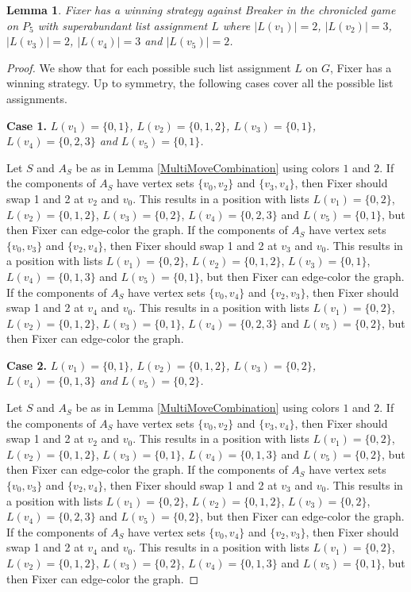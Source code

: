 \documentclass[12pt]{amsart}
\theoremstyle{plain}
\newtheorem{lem}[thm]{Lemma}
\theoremstyle{definition}
\theoremstyle{remark}
\begin{document}

\begin{lem}\label{P5_2}
Fixer has a winning strategy against Breaker in the chronicled game on $P_5$ with superabundant list assignment $L$ where $|L(v_1)| = 2$, $|L(v_2)| = 3$, $|L(v_3)| = 2$, $|L(v_4)| = 3$ and $|L(v_5)| = 2$.
\end{lem}
\begin{proof}
We show that for each possible such list assignment $L$ on $G$, Fixer has a winning strategy.
Up to symmetry, the following cases cover all the possible list assignments.

\noindent\textbf{Case 1.  }\textit{$L(v_1) = \{0, 1\}$, $L(v_2) = \{0, 1, 2\}$, $L(v_3) = \{0, 1\}$, $L(v_4) = \{0, 2, 3\}$ and $L(v_5) = \{0, 1\}$.}

Let $S$ and $A_S$ be as in Lemma \ref{MultiMoveCombination} using colors $1$ and $2$. If the components of $A_S$ have vertex sets $\{v_0, v_2\}$ and $\{v_3, v_4\}$, then Fixer should swap 1 and 2 at $v_2$ and $v_0$. This results in a position with lists $L(v_1) = \{0, 2\}$, $L(v_2) = \{0, 1, 2\}$, $L(v_3) = \{0, 2\}$, $L(v_4) = \{0, 2, 3\}$ and $L(v_5) = \{0, 1\}$, but then Fixer can edge-color the graph.
If the components of $A_S$ have vertex sets $\{v_0, v_3\}$ and $\{v_2, v_4\}$, then Fixer should swap 1 and 2 at $v_3$ and $v_0$. This results in a position with lists $L(v_1) = \{0, 2\}$, $L(v_2) = \{0, 1, 2\}$, $L(v_3) = \{0, 1\}$, $L(v_4) = \{0, 1, 3\}$ and $L(v_5) = \{0, 1\}$, but then Fixer can edge-color the graph.
If the components of $A_S$ have vertex sets $\{v_0, v_4\}$ and $\{v_2, v_3\}$, then Fixer should swap 1 and 2 at $v_4$ and $v_0$. This results in a position with lists $L(v_1) = \{0, 2\}$, $L(v_2) = \{0, 1, 2\}$, $L(v_3) = \{0, 1\}$, $L(v_4) = \{0, 2, 3\}$ and $L(v_5) = \{0, 2\}$, but then Fixer can edge-color the graph.

\noindent\textbf{Case 2.  }\textit{$L(v_1) = \{0, 1\}$, $L(v_2) = \{0, 1, 2\}$, $L(v_3) = \{0, 2\}$, $L(v_4) = \{0, 1, 3\}$ and $L(v_5) = \{0, 2\}$.}

Let $S$ and $A_S$ be as in Lemma \ref{MultiMoveCombination} using colors $1$ and $2$. If the components of $A_S$ have vertex sets $\{v_0, v_2\}$ and $\{v_3, v_4\}$, then Fixer should swap 1 and 2 at $v_2$ and $v_0$. This results in a position with lists $L(v_1) = \{0, 2\}$, $L(v_2) = \{0, 1, 2\}$, $L(v_3) = \{0, 1\}$, $L(v_4) = \{0, 1, 3\}$ and $L(v_5) = \{0, 2\}$, but then Fixer can edge-color the graph.
If the components of $A_S$ have vertex sets $\{v_0, v_3\}$ and $\{v_2, v_4\}$, then Fixer should swap 1 and 2 at $v_3$ and $v_0$. This results in a position with lists $L(v_1) = \{0, 2\}$, $L(v_2) = \{0, 1, 2\}$, $L(v_3) = \{0, 2\}$, $L(v_4) = \{0, 2, 3\}$ and $L(v_5) = \{0, 2\}$, but then Fixer can edge-color the graph.
If the components of $A_S$ have vertex sets $\{v_0, v_4\}$ and $\{v_2, v_3\}$, then Fixer should swap 1 and 2 at $v_4$ and $v_0$. This results in a position with lists $L(v_1) = \{0, 2\}$, $L(v_2) = \{0, 1, 2\}$, $L(v_3) = \{0, 2\}$, $L(v_4) = \{0, 1, 3\}$ and $L(v_5) = \{0, 1\}$, but then Fixer can edge-color the graph.


\end{proof}
\end{document}
